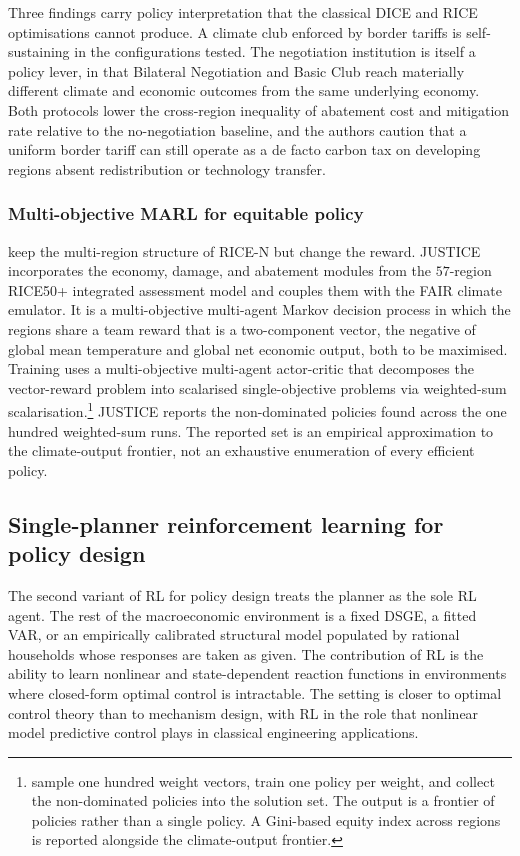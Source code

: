 Three findings carry policy interpretation that the classical DICE
and RICE optimisations cannot produce. A climate club enforced by
border tariffs is self-sustaining in the configurations tested. The
negotiation institution is itself a policy lever, in that Bilateral
Negotiation and Basic Club reach materially different climate and
economic outcomes from the same underlying economy. Both protocols
lower the cross-region inequality of abatement cost and mitigation
rate relative to the no-negotiation baseline, and the authors
caution that a uniform border tariff can still operate as a de
facto carbon tax on developing regions absent redistribution or
technology transfer.

\subsubsection{Multi-objective MARL for equitable policy}
\label{sec:macro:justice}

\citet{Biswas2025justice} keep the multi-region structure of RICE-N
but change the reward. JUSTICE incorporates the economy, damage, and
abatement modules from the $57$-region RICE50+ integrated assessment
model and couples them with the FAIR climate emulator. It is a
multi-objective multi-agent Markov decision process in which the
regions share a team reward that is a two-component vector, the
negative of global mean temperature and global net economic output,
both to be maximised.
Training uses a multi-objective multi-agent actor-critic that
decomposes the vector-reward problem into scalarised single-objective
problems via weighted-sum scalarisation.\footnote{\citet{Biswas2025justice}
sample one hundred weight vectors, train one policy per weight, and
collect the non-dominated policies into the solution set. The output
is a frontier of policies rather than a single policy. A Gini-based
equity index across regions is reported alongside the climate-output
frontier.} JUSTICE reports the non-dominated policies found across the
one hundred weighted-sum runs. The reported set is an empirical
approximation to the climate-output frontier, not an exhaustive
enumeration of every efficient policy.

\subsection{Single-planner reinforcement learning for policy design}
\label{sec:macro:policy_single}

The second variant of RL for policy design treats the planner as the
sole RL agent. The rest of the macroeconomic environment is a fixed
DSGE, a fitted VAR, or an empirically calibrated structural model
populated by rational households whose responses are taken as given.
The contribution of RL is the ability to learn nonlinear and
state-dependent reaction functions in environments where closed-form
optimal control is intractable. The setting is closer to optimal
control theory than to mechanism design, with RL in the role that
nonlinear model predictive control plays in classical engineering
applications.

